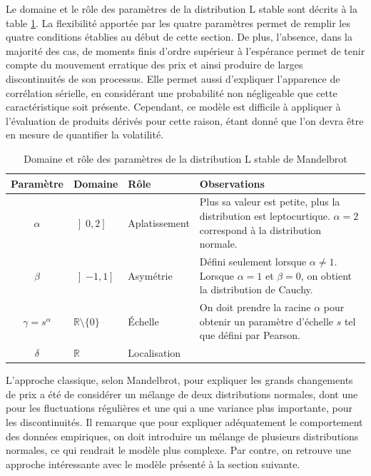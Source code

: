 Le domaine et le rôle des paramètres de la distribution L stable sont
décrits à la table \ref{tab:roleparam}. La flexibilité apportée par les
quatre paramètres permet de remplir les quatre conditions établies au
début de cette section. De plus, l'absence, dans la majorité des cas,
de moments finis d'ordre supérieur à l'espérance permet de tenir
compte du mouvement erratique des prix et ainsi produire de larges
discontinuités de son processus. Elle permet aussi d'expliquer
l'apparence de corrélation sérielle, en considérant une probabilité
non négligeable que cette caractéristique soit présente. Cependant, ce
modèle est difficile à appliquer à l'évaluation de produits dérivés
pour cette raison, étant donné que l'on devra être en mesure de
quantifier la volatilité.
\begin{table}[!ht]
  \centering
  \begin{tabular}{|c|p{1.75cm}|p{2.5cm}|p{6.25cm}|}
    \hline
    \textbf{Paramètre} & \textbf{Domaine} & \textbf{Rôle} & \textbf{Observations} \\
    \hline
    $\alpha$ & $\left]0,2\right]$ & Aplatissement & Plus sa valeur est petite, plus la distribution est leptocurtique. $\alpha=2$ correspond à la distribution normale. \\
    $\beta$ & $\left] -1, 1 \right]$ & Asymétrie & Défini seulement lorsque $\alpha \neq 1$. Lorsque $\alpha=1$ et $\beta=0$, on obtient la distribution de Cauchy.  \\
    $\gamma = s^{\alpha}$ & $\mathbb{R}\setminus\{0 \}$ & Échelle & On doit prendre la racine $\alpha$ pour obtenir un paramètre d'échelle $s$ tel que défini par Pearson. \\
    $\delta$ & $\mathbb{R}$ & Localisation & \\
    \hline
  \end{tabular}
  \caption{Domaine et rôle des paramètres de la distribution L stable de Mandelbrot}
  \label{tab:roleparam}
\end{table}

L'approche classique, selon Mandelbrot, pour expliquer les grands
changements de prix a été de considérer un mélange de deux
distributions normales, dont une pour les fluctuations régulières et
une qui a une variance plus importante, pour les discontinuités. Il
remarque que pour expliquer adéquatement le comportement des données
empiriques, on doit introduire un mélange de plusieurs distributions
normales, ce qui rendrait le modèle plus complexe. Par contre, on
retrouve une approche intéressante avec le modèle présenté à la
section suivante.


